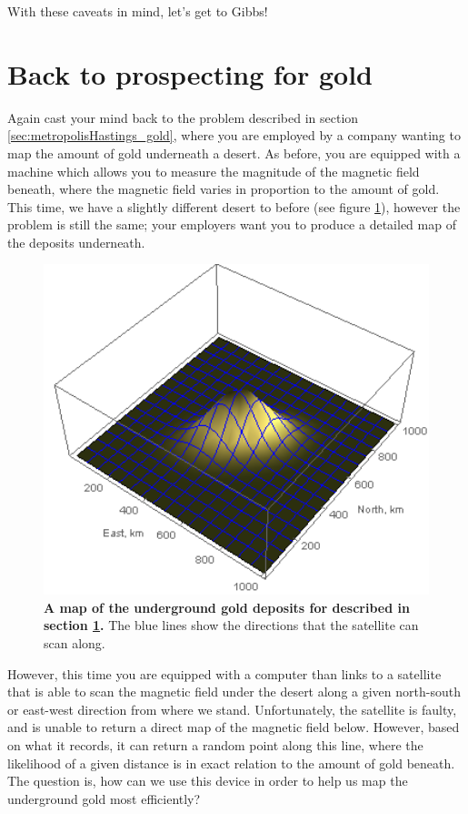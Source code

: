 \documentclass[11pt,fullpage]{book}
\begin{document}
With these caveats in mind, let's get to Gibbs!

\section{Back to prospecting for gold}\label{sec:Gibbs_gold}
Again cast your mind back to the problem described in section \ref{sec:metropolisHastings_gold}, where you are employed by a company wanting to map the amount of gold underneath a desert. As before, you are equipped with a machine which allows you to measure the magnitude of the magnetic field beneath, where the magnetic field varies in proportion to the amount of gold. This time, we have a slightly different desert to before (see figure \ref{fig:Gibbs_goldMiningAgain1}), however the problem is still the same; your employers want you to produce a detailed map of the deposits underneath. 

\begin{figure}
\centerline{\includegraphics[width=1\textwidth]{Gibbs_goldMiningAgain1.png}}
\caption{\textbf{A map of the underground gold deposits for described in section \ref{sec:Gibbs_gold}.} The blue lines show the directions that the satellite can scan along.}\label{fig:Gibbs_goldMiningAgain1}
\end{figure}

However, this time you are equipped with a computer than links to a satellite that is able to scan the magnetic field under the desert along a given north-south or east-west direction from where we stand. Unfortunately, the satellite is faulty, and is unable to return a direct map of the magnetic field below. However, based on what it records, it can return a random point along this line, where the likelihood of a given distance is in exact relation to the amount of gold beneath. The question is, how can we use this device in order to help us map the underground gold most efficiently?
\end{document}
